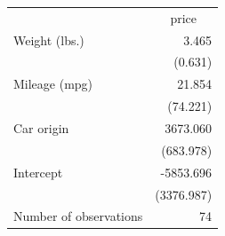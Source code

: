 \documentclass{article}
\begin{document}
\begin{table}[!h]
\centering
\begin{tabular}{ll}
\cline{1-2}
\multicolumn{1}{r}{} &
  \multicolumn{1}{c}{price} \\
\cline{1-2}
\multicolumn{1}{l}{Weight (lbs.)} &
  \multicolumn{1}{r}{3.465} \\
\multicolumn{1}{l}{} &
  \multicolumn{1}{r}{(0.631)} \\
\multicolumn{1}{l}{Mileage (mpg)} &
  \multicolumn{1}{r}{21.854} \\
\multicolumn{1}{l}{} &
  \multicolumn{1}{r}{(74.221)} \\
\multicolumn{1}{l}{Car origin} &
  \multicolumn{1}{r}{3673.060} \\
\multicolumn{1}{l}{} &
  \multicolumn{1}{r}{(683.978)} \\
\multicolumn{1}{l}{Intercept} &
  \multicolumn{1}{r}{-5853.696} \\
\multicolumn{1}{l}{} &
  \multicolumn{1}{r}{(3376.987)} \\
\multicolumn{1}{l}{Number of observations} &
  \multicolumn{1}{r}{74} \\
\cline{1-2}
\end{tabular}
\end{table}
\end{document}
